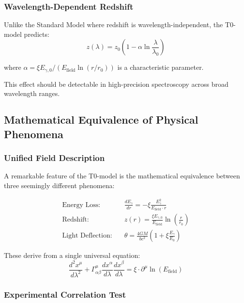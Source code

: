 \documentclass[12pt,a4paper]{article}
\theoremstyle{definition}
\begin{document}
\subsubsection{Wavelength-Dependent Redshift}

Unlike the Standard Model where redshift is wavelength-independent, the T0-model predicts:
\begin{equation}
	\boxed{z(\lambda) = z_0\left(1 - \alpha \ln\frac{\lambda}{\lambda_0}\right)}
\end{equation}

where $\alpha = \xi E_{\gamma,0}/(E_{\text{field}} \ln(r/r_0))$ is a characteristic parameter.

This effect should be detectable in high-precision spectroscopy across broad wavelength ranges.

\subsection{Mathematical Equivalence of Physical Phenomena}

\subsubsection{Unified Field Description}

A remarkable feature of the T0-model is the mathematical equivalence between three seemingly different phenomena:

\begin{align}
	\text{Energy Loss:} \quad & \frac{dE_\gamma}{dr} = -\xi \frac{E_\gamma^2}{E_{\text{field}} \cdot r} \\
	\text{Redshift:} \quad & z(r) = \frac{\xi E_{\gamma,0}}{E_{\text{field}}} \ln\left(\frac{r}{r_0}\right) \\
	\text{Light Deflection:} \quad & \theta = \frac{4GM}{bc^2}\left(1 + \xi \frac{E_\gamma}{E_0}\right)
\end{align}

These derive from a single universal equation:
\begin{equation}
	\boxed{\frac{d^2 x^\mu}{d\lambda^2} + \Gamma^\mu_{\alpha\beta}\frac{dx^\alpha}{d\lambda}\frac{dx^\beta}{d\lambda} = \xi \cdot \partial^\mu \ln(E_{\text{field}})}
\end{equation}

\subsubsection{Experimental Correlation Test}
\end{document}
